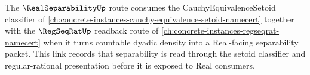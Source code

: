 The $\RealSeparabilityUp$ route consumes the CauchyEquivalenceSetoid classifier of \autoref{ch:concrete-instances-cauchy-equivalence-setoid-namecert} together with the $\RegSeqRatUp$ readback route of \autoref{ch:concrete-instances-regseqrat-namecert} when it turns countable dyadic density into a Real-facing separability packet. This link records that separability is read through the setoid classifier and regular-rational presentation before it is exposed to Real consumers.

